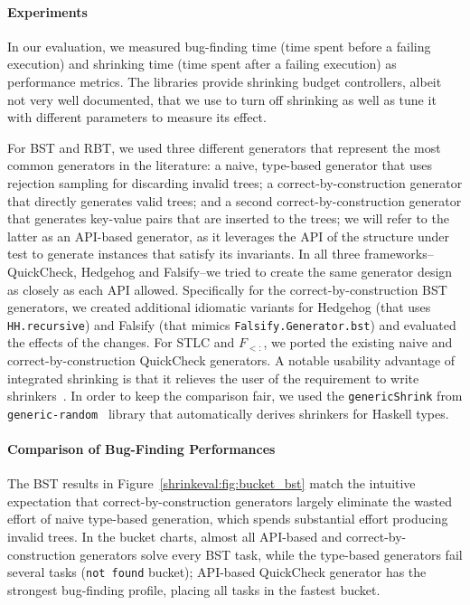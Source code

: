 \paragraph*{Experiments} \label{shrinkeval:sec:experiments}

In our evaluation, we measured bug-finding time (time spent before a failing execution)
and shrinking time (time spent after a failing execution) as performance metrics. The
libraries provide shrinking budget controllers, albeit not very well documented, that
we use to turn off shrinking as well as tune it with different parameters to measure
its effect.

For BST and RBT, we used three different generators that represent the most common
generators in the literature: a naive, type-based generator that uses rejection
sampling for discarding invalid trees; a correct-by-construction generator that
directly generates valid trees; and a second correct-by-construction generator that
generates key-value pairs that are inserted to the trees; we will refer to the latter
as an API-based generator, as it leverages the API of the structure under test to
generate instances that satisfy its invariants. In all three frameworks--QuickCheck,
Hedgehog and Falsify--we tried to create the same generator design as closely as each
API allowed. Specifically for the correct-by-construction BST generators, we created
additional idiomatic variants for Hedgehog (that uses \texttt{HH.recursive}) and
Falsify (that mimics \texttt{Falsify.Generator.bst}) and evaluated the effects of the
changes. For STLC and $F_{<:}$, we ported the existing naive and
correct-by-construction QuickCheck generators. A notable usability advantage of
integrated shrinking is that it relieves the user of the requirement to write
shrinkers~\cite{falsify,HypothesisShrinking}. In order to keep the comparison fair, we
used the \texttt{genericShrink} from \texttt{generic-random}~\cite{genericRandom}
library that automatically derives shrinkers for Haskell types.

\paragraph*{Comparison of Bug-Finding Performances}

The BST results in Figure~\ref{shrinkeval:fig:bucket_bst} match the intuitive
expectation that correct-by-construction generators largely eliminate the wasted effort
of naive type-based generation, which spends substantial effort producing invalid
trees. In the bucket charts, almost all API-based and correct-by-construction
generators solve every BST task, while the type-based generators fail several tasks
(\texttt{not found} bucket); API-based QuickCheck generator has the strongest
bug-finding profile, placing all tasks in the fastest bucket.

